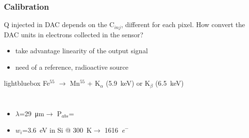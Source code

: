     \begin{frame}
        \frametitle{Calibration}
        Q injected in DAC depends on the C$_{inj}$, different for each pixel.     
        \bigskip
        How convert the DAC units in electrons collected in the sensor?\\
        \begin{itemize}
            \item take advantage linearity of the output signal 
            \item need of a reference, radioactive source
        \end{itemize}
        \medskip
        \begin{beamercolorbox}[sep=0em,wd=0.85\textwidth,ht=1.5ex, dp=0.1ex, rounded=true, center]{lightbluebox}
            Fe$^{55}$ $\rightarrow$ Mn$^{55}$ + K$_\alpha$ (\SI{5.9}{keV}) or K$_\beta$ (\SI{6.5}{keV})
        \end{beamercolorbox}
        \begin{columns}
            \begin{itemize}
                \item $\lambda$=\SI{29}{\um}$\rightarrow$ P$_{abs}$=
                \item $w_i$=\SI{3.6}{eV} in Si @ \SI{300}{\kelvin}$\rightarrow$ \SI{1616}{\elementarycharge}$^-$
            \end{itemize}
        \end{columns}
    \end{frame}  


